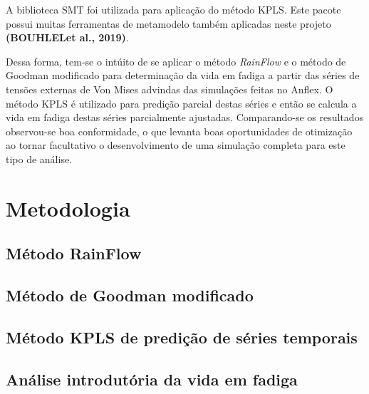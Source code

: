 A biblioteca SMT foi utilizada para aplicação do método KPLS. Este pacote possui muitas ferramentas de metamodelo também aplicadas neste projeto \textbf{(BOUHLELet al., 2019)}.

Dessa forma, tem-se o intúito de se aplicar o método \emph{RainFlow} e o método de Goodman modificado para determinação da vida em fadiga a partir das séries de tensões externas de Von Mises advindas das simulações feitas no Anflex. O método KPLS é utilizado para predição parcial destas séries e então se calcula a vida em fadiga destas séries parcialmente ajustadas. Comparando-se os resultados observou-se boa conformidade, o que levanta boas oportunidades de otimização ao tornar facultativo o desenvolvimento de uma simulação completa para este tipo de análise. 



\section{Metodologia}

\subsection{Método RainFlow}

\subsection{Método de Goodman modificado}

\subsection{Método KPLS de predição de séries temporais}

\subsection{Análise introdutória da vida em fadiga}



